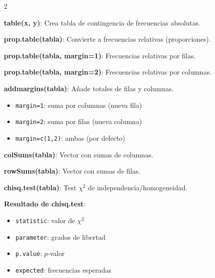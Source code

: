 \documentclass[10pt,a4paper]{article}
\begin{document}
\begin{multicols}{2}
    \begin{tcolorbox}[title=Construcción de Tablas, equal height group=IH3]
        \textbf{table(x, y)}: Crea tabla de contingencia de frecuencias absolutas.
        
        \textbf{prop.table(tabla)}: Convierte a frecuencias relativas (proporciones).
        
        \textbf{prop.table(tabla, margin=1)}: Frecuencias relativas por filas.
        
        \textbf{prop.table(tabla, margin=2)}: Frecuencias relativas por columnas.
        
        \textbf{addmargins(tabla)}: Añade totales de filas y columnas.
        \begin{itemize}
            \item \texttt{margin=1}: suma por columnas (nueva fila)
            \item \texttt{margin=2}: suma por filas (nueva columna)
            \item \texttt{margin=c(1,2)}: ambas (por defecto)
        \end{itemize}
    \end{tcolorbox}
    \begin{tcolorbox}[title=Operaciones con Tablas, equal height group=IH3]
        \textbf{colSums(tabla)}: Vector con sumas de columnas.
        
        \textbf{rowSums(tabla)}: Vector con sumas de filas.
        
        \textbf{chisq.test(tabla)}: Test $\chi^2$ de independencia/homogeneidad.
        
        \textbf{Resultado de chisq.test}:
        \begin{itemize}
            \item \texttt{statistic}: valor de $\chi^2$
            \item \texttt{parameter}: grados de libertad
            \item \texttt{p.value}: $p$-valor
            \item \texttt{expected}: frecuencias esperadas
        \end{itemize}
    \end{tcolorbox}
\end{multicols}
\end{document}
